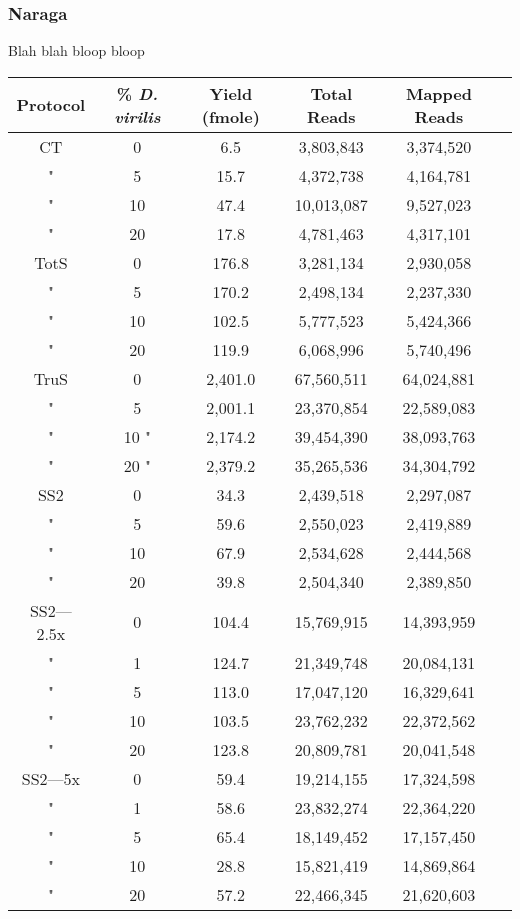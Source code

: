 \subsubsection{Naraga}
Blah blah bloop bloop



\begin{table}[htdp]
\begin{center}
\begin{tabular}{|c|c|c|c|c|c|} \hline
Protocol & \% {\em D. virilis}  &  Yield (fmole) & Total Reads & Mapped Reads \\\hline 
CT & 0  & 6.5  & 3,803,843 &3,374,520 \\
" &  5 & 15.7  & 4,372,738 &4,164,781 \\
" & 10 & 47.4  & 10,013,087 &9,527,023 \\
" & 20 & 17.8  & 4,781,463 &4,317,101 \\
TotS & 0  & 176.8  & 3,281,134 &2,930,058 \\
" &  5  & 170.2  & 2,498,134 &2,237,330 \\
" & 10  & 102.5  & 5,777,523 &5,424,366 \\
" & 20  & 119.9  & 6,068,996 &5,740,496 \\
TruS & 0  & 2,401.0  & 67,560,511 &64,024,881 \\
" &  5  & 2,001.1  & 23,370,854 &22,589,083 \\
" & 10 " & 2,174.2  & 39,454,390 &38,093,763 \\
" & 20 " & 2,379.2  & 35,265,536 &34,304,792 \\
SS2 & 0 & 34.3  & 2,439,518 &2,297,087 \\
" &  5 & 59.6  & 2,550,023 &2,419,889 \\
" & 10 & 67.9  & 2,534,628 &2,444,568 \\
" & 20 & 39.8  & 2,504,340 &2,389,850 \\
SS2---2.5x & 0 & 104.4  & 15,769,915 &14,393,959 \\
" &  1 & 124.7  & 21,349,748 &20,084,131 \\
" &  5 & 113.0  & 17,047,120 &16,329,641 \\
" & 10 & 103.5  & 23,762,232 &22,372,562 \\
" & 20 & 123.8  & 20,809,781 &20,041,548 \\
SS2---5x & 0 & 59.4  & 19,214,155 &17,324,598 \\
" &  1 & 58.6  & 23,832,274 &22,364,220 \\
" &  5 & 65.4  & 18,149,452 &17,157,450 \\
" & 10 & 28.8  & 15,821,419 &14,869,864 \\
" & 20 & 57.2  & 22,466,345 &21,620,603 \\
\hline
\end{tabular}
\label{tab:protocols}
\end{center}
\end{table}
      
